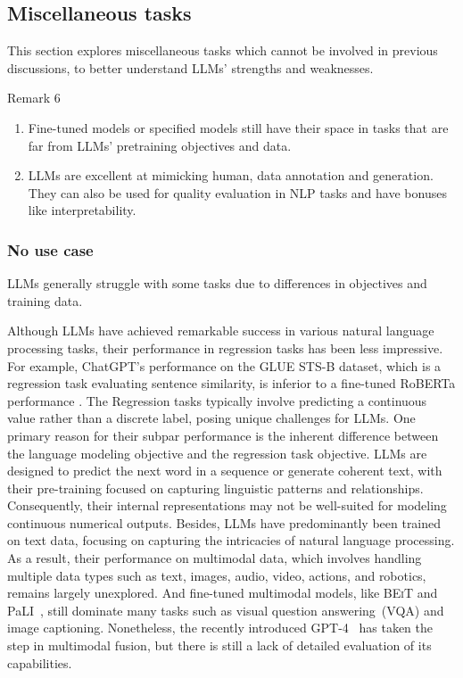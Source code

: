 \documentclass[manuscript,screen, nonacm]{acmart}
\begin{document}
\subsection{Miscellaneous tasks}
This section explores miscellaneous tasks which cannot be involved in previous discussions, to better understand LLMs' strengths and weaknesses. 

\begin{applebox}{Remark 6}
\begin{enumerate}[leftmargin=0.4cm]
    \item Fine-tuned models or specified models still have their space in tasks that are far from LLMs' pretraining objectives and data.
    \item LLMs are excellent at mimicking human, data annotation and generation. They can also be used for quality evaluation in NLP tasks and have bonuses like interpretability.
\end{enumerate}
\end{applebox}




\subsubsection{No use case} LLMs generally struggle with some tasks due to differences in objectives and training data.

Although LLMs have achieved remarkable success in various natural language processing tasks, their performance in regression tasks has been less impressive. For example, ChatGPT's performance on the GLUE STS-B dataset, which is a regression task evaluating sentence similarity, is inferior to a fine-tuned RoBERTa performance \cite{zhong2023can}. The  Regression tasks typically involve predicting a continuous value rather than a discrete label, posing unique challenges for LLMs. One primary reason for their subpar performance is the inherent difference between the language modeling objective and the regression task objective. LLMs are designed to predict the next word in a sequence or generate coherent text, with their pre-training focused on capturing linguistic patterns and relationships. Consequently, their internal representations may not be well-suited for modeling continuous numerical outputs. 
Besides, LLMs have predominantly been trained on text data, focusing on capturing the intricacies of natural language processing. As a result, their performance on multimodal data, which involves handling multiple data types such as text, images, audio, video, actions, and robotics, remains largely unexplored. And fine-tuned multimodal models, like BE\textsc{i}T\cite{wang2022image} and PaLI~\cite{chen2022pali}, still dominate many tasks such as visual question answering~(VQA) and image captioning. Nonetheless, the recently introduced GPT-4~\cite{openai2023gpt4} has taken the step in multimodal fusion, but there is still a lack of detailed evaluation of its capabilities.
\end{document}
